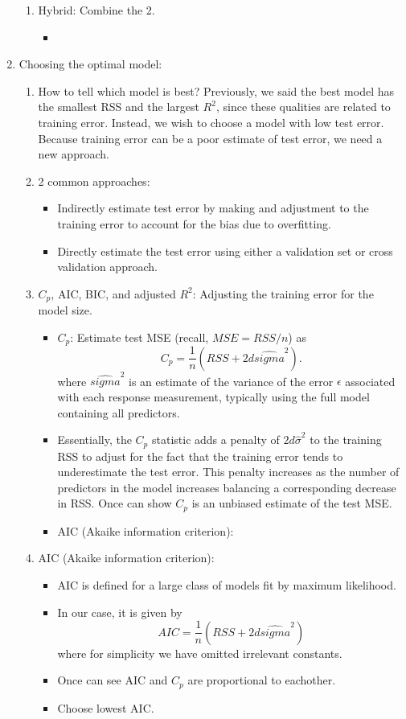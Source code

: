 \documentclass{article}
\begin{document}
\begin{enumerate}
\begin{enumerate}
\item Hybrid: Combine the 2.
\begin{itemize}
\item 
\end{itemize}

\end{enumerate}

\item Choosing the optimal model:
\begin{enumerate}
\item How to tell which model is best? Previously, we said the best model has the smallest RSS and the largest $R^2$, since these qualities are related to training error. Instead, we wish to choose a model with low test error. Because training error can be a poor estimate of test error, we need a new approach.
\item 2 common approaches:
\begin{itemize}
\item Indirectly estimate test error by making and adjustment to the training error to account for the bias due to overfitting.
\item Directly estimate the test error using either a validation set or cross validation approach.
\end{itemize}

\item $C_p$, AIC, BIC, and adjusted $R^2$: Adjusting the training error for the model size.
\begin{itemize}
\item $C_p$: Estimate test MSE (recall, $MSE = RSS/n$) as
\[
C_p = \frac{1}{n} (RSS + 2 d \hat{sigma}^2).
\]
where $\hat{sigma}^2$ is an estimate of the variance of the error $\epsilon$ associated with each response measurement, typically using the full model containing all predictors. 
\item Essentially, the $C_p$ statistic adds a penalty of $2d\hat{\sigma}^2$ to the training RSS to adjust for the fact that the training error tends to underestimate the test error. This penalty increases as the number of predictors in the model increases balancing a corresponding decrease in RSS. Once can show $C_p$ is an unbiased estimate of the test MSE.
\item AIC (Akaike information criterion): 
\end{itemize}

\item AIC (Akaike information criterion): 
\begin{itemize}
\item AIC is defined for a large class of models fit by maximum likelihood.
\item In our case, it is given by
\[
AIC = \frac{1}{n} (RSS + 2d \hat{sigma}^2 )
\]
where for simplicity we have omitted irrelevant constants. 
\item Once can see AIC and $C_p$ are proportional to eachother.
\item Choose lowest AIC.
\end{itemize}


\end{enumerate}
\end{enumerate}
\end{document}

